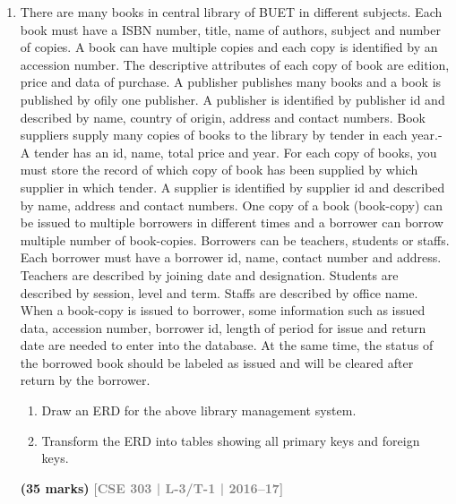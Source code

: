 \documentclass[12pt,a3paper]{article}
\newcommand{\yr}[1]{\hfill\textcolor{gray}{\small\textbf{[#1]}}}
\newcommand{\mk}[1]{\textcolor{orange!70!black}{\small\textbf{(#1 marks)}}}
\begin{document}
\begin{enumerate}
\item 
There are many books in central library of BUET in different subjects. Each book must
have a ISBN number, title, name of authors, subject and number of copies. A book can
have multiple copies and each copy is identified by an accession number. The
descriptive attributes of each copy of book are edition, price and data of purchase. A
publisher publishes many books and a book is published by ofily one publisher. A
publisher is identified by publisher id and described by name, country of origin,
address and contact numbers.
Book suppliers supply many copies of books to the library by tender in each year.- A
tender has an id, name, total price and year. For each copy of books, you must store the
record of which copy of book has been supplied by which supplier in which tender. A
supplier is identified by supplier id and described by name, address and contact
numbers.
One copy of a book (book-copy) can be issued to multiple borrowers in different times
and a borrower can borrow multiple number of book-copies. Borrowers can be
teachers, students or staffs. Each borrower must have a borrower id, name, contact
number and address. Teachers are described by joining date and designation. Students
are described by session, level and term. Staffs are described by office name.
When a book-copy is issued to borrower, some information such as issued data,
accession number, borrower id, length of period for issue and return date are needed to
enter into the database. At the same time, the status of the borrowed book should be
labeled as issued and will be cleared after return by the borrower.
\begin{enumerate}
  \item Draw an ERD for the above library management system.
  \item Transform the ERD into tables showing all primary keys and foreign keys.
\end{enumerate}
\mk{35} \yr{CSE 303 | L-3/T-1 | 2016--17}


\end{enumerate}
\end{document}
